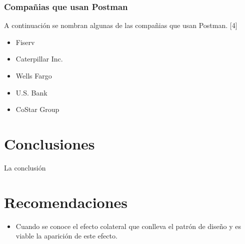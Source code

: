 \documentclass[twoside,twocolumn]{article}
\begin{document}
\subsubsection{Compañias que usan Postman}

A continuación se nombran algunas de las compañias que usan Postman. [4]

\begin{itemize}
  \item Fiserv
  \item Caterpillar Inc.
  \item Wells Fargo
  \item U.S. Bank
  \item CoStar Group
\end{itemize}





\section{Conclusiones}

La conclusión 

\section{Recomendaciones}


\begin{itemize}
\item Cuando se conoce el efecto colateral que conlleva el patrón de diseño y es viable la aparición de este efecto.

\end{itemize}



\end{document}
